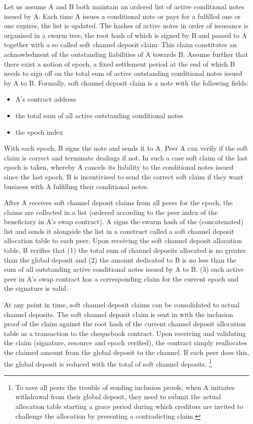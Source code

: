 \documentclass[a4paper,10pt]{article}
\begin{document}
Let us assume A and B both maintain an ordered list of active conditional notes issued by A.
Each time A issues a conditional note or pays for a fulfilled one or one expires, the list is updated.
The hashes of active notes in order of issueance is organised in a swarm tree, the
root hash of which is signed by B and passed to A together with a so called
\gls{soft channel deposit claim}. This claim constitutes an acknowledment of
the outstanding liabilities of A towards B. Assume further that there exist a notion of \gls{epoch},
a fixed settlement period at the end of which B needs to sign off on the total sum of active
outstanding conditional notes issued by A to B.
Formally, soft channel deposit claim is a note with the following fields:

\begin{itemize}
  \item A's contract address
  \item the total sum of all active outstanding conditional notes
  \item the epoch index
\end{itemize}

With each epoch, B signs the note and sends it to A.
Peer A can verify if the soft claim is correct and terminate dealings if not. In such a case soft claim of
the last epoch is taken, whereby A cancels its liability to the conditional notes issued since
the last epoch.
B is incentivised to send the correct soft claim if they want business with A fulfilling their
conditional notes.

After A receives soft channel deposit claims from all peers for the epoch, the claims are
collected in a list (ordered according to the peer index of the beneficiary in A's swap contract).
A signs the swarm hash of the (concatenated) list and sends it alongside the list
in a construct called a \gls{soft channel deposit allocation table} to each peer.
Upon receiving the soft channel deposit allocation table, B verifies that
(1) the total sum of channel deposits allocated is no greater than the global deposit and
(2) the amount dedicated to B is no less than the sum of all outstanding active
conditional notes issued by A to B.
(3) each active peer in A's swap contract has a corresponding claim for the current epoch and the signature is valid.

At any point in time, soft channel deposit claims can be consolidated to actual
channel deposits.
The soft channel deposit claim is sent in with the inclusion proof of the claim against the root hash of the
current channel deposit allocation table as a transaction to the
chequebook contract. Upon receiving and validating the claim (signature, resource and epoch verified),
the contract simply reallocates the claimed amount from the global deposit to the channel.
If each peer does this, the global deposit is reduced with the total of soft channel
deposits.%
%
\footnote{To save all peers the trouble of sending inclusion proofs, when A initiates withdrawal from
their global deposit, they need to submit the actual allocation table starting a grace period during which
creditors are invited to challenge the allocation by presenting a contradicting claim.}
\end{document}
